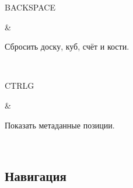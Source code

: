 \documentclass[letterpaper,10pt,russian]{sphinxmanual}
\begin{document}
\begin{savenotes}
\begin{tabular}[t]{}
\begin{varwidth}[t]{}
\sphinxAtStartPar
BACKSPACE
\sphinxbeforeendvarwidth
\end{varwidth}%
&\begin{varwidth}[t]{}
\sphinxAtStartPar
Сбросить доску, куб, счёт и кости.
\sphinxbeforeendvarwidth
\end{varwidth}%
\\
\sphinxhline\begin{varwidth}[t]{}
\sphinxAtStartPar
CTRL\sphinxhyphen{}G
\sphinxbeforeendvarwidth
\end{varwidth}%
&\begin{varwidth}[t]{}
\sphinxAtStartPar
Показать метаданные позиции.
\sphinxbeforeendvarwidth
\end{varwidth}%
\\
\sphinxbottomrule
\end{tabular}
\sphinxtableafterendhook\par
\sphinxattableend\end{savenotes}


\subsection{Навигация}
\label{\detokenize{raccourcis:navigation}}\label{\detokenize{raccourcis:raccourcis-navigation}}
\end{document}
